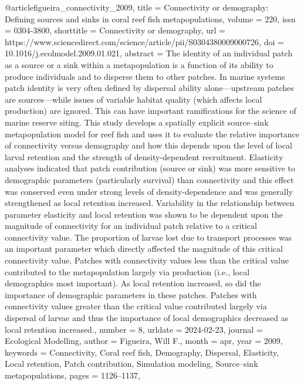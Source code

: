 {{{{@article{figueira_connectivity_2009,
	title = {Connectivity or demography: {Defining} sources and sinks in coral reef fish metapopulations},
	volume = {220},
	issn = {0304-3800},
	shorttitle = {Connectivity or demography},
	url = {https://www.sciencedirect.com/science/article/pii/S0304380009000726},
	doi = {10.1016/j.ecolmodel.2009.01.021},
	abstract = {The identity of an individual patch as a source or a sink within a metapopulation is a function of its ability to produce individuals and to disperse them to other patches. In marine systems patch identity is very often defined by dispersal ability alone—upstream patches are sources—while issues of variable habitat quality (which affects local production) are ignored. This can have important ramifications for the science of marine reserve siting. This study develops a spatially explicit source–sink metapopulation model for reef fish and uses it to evaluate the relative importance of connectivity versus demography and how this depends upon the level of local larval retention and the strength of density-dependent recruitment. Elasticity analyses indicated that patch contribution (source or sink) was more sensitive to demographic parameters (particularly survival) than connectivity and this effect was conserved even under strong levels of density-dependence and was generally strengthened as local retention increased. Variability in the relationship between parameter elasticity and local retention was shown to be dependent upon the magnitude of connectivity for an individual patch relative to a critical connectivity value. The proportion of larvae lost due to transport processes was an important parameter which directly affected the magnitude of this critical connectivity value. Patches with connectivity values less than the critical value contributed to the metapopulation largely via production (i.e., local demographics most important). As local retention increased, so did the importance of demographic parameters in these patches. Patches with connectivity values greater than the critical value contributed largely via dispersal of larvae and thus the importance of local demographics decreased as local retention increased.},
	number = {8},
	urldate = {2024-02-23},
	journal = {Ecological Modelling},
	author = {Figueira, Will F.},
	month = apr,
	year = {2009},
	keywords = {Connectivity, Coral reef fish, Demography, Dispersal, Elasticity, Local retention, Patch contribution, Simulation modeling, Source–sink metapopulations},
	pages = {1126--1137},
}

}}}}
